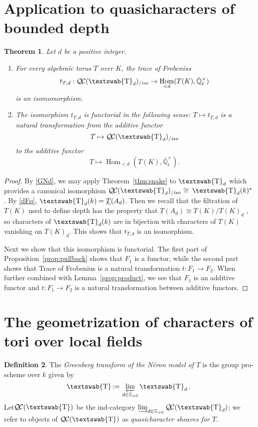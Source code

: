 \documentclass[11pt]{amsart}
\newcommand{\mathswab}[1]{\operatorname{\textswab{#1}}}
\theoremstyle{plain}
\newtheorem{theorem}{Theorem}[section]
\theoremstyle{definition}
\newtheorem{definition}[theorem]{Definition}
\theoremstyle{remark}
\newcommand{\ZZ}{{\mathbb{Z}}}
\newcommand{\EE}{\mathbb{\bar Q}_\ell}
\newcommand{\Fq}{k}
\newcommand{\EEx}{\EE^\times}
\DeclareMathOperator{\Hom}{Hom}
\newcommand{\cdef}[1]{ {#1}\index{#1} }
\newcommand{\ceq}{{\, :=\, }}
\newcommand{\iso}{{\ \cong\ }}
\newcommand{\GN}[1]{\mathswab{#1}}
\newcommand{\TT}{\underline{T}}
\newcommand{\QC}{{\mathcal{Q\hskip-0.8pt C}}}
\newcommand{\QCiso}[1]{\QC(#1)_{/\textit{iso}}}
\newcommand{\trFrob}[1]{t_{#1}}
\begin{document}
\section{Application to quasicharacters of bounded depth} \label{sec:bdchar}

\begin{theorem}\label{thm:application}
Let $d$ be a positive integer.
\begin{enumerate}
\item 
For every algebraic torus $T$ over $K$, the trace of Frobenius 
  \[
\trFrob{T,d}:  \QCiso{\GN{T}_d} \to \Hom_{< d}(T(K),\EEx)
  \]
is an isomomorphism. 
\item The isomorphism $\trFrob{T,d}$ is functorial in the following sense: $T \mapsto \trFrob{T,d}$ is a natural transformation
from the additive functor
\[T \mapsto \QCiso{\GN{T}_d}\]
to the additive functor
\[
T \mapsto \Hom_{<d}(T(K),\EEx).
\]
\end{enumerate}
\end{theorem}

\begin{proof}
  By \ref{GNd}, we may apply Theorem~\ref{thm:snake} to
  $\GN{T}_d$ which provides a canonical isomorphism
  $\QCiso{\GN{T}_d} \iso \GN{T}_d(\Fq)^*$.
  By \ref{dFq}, $\GN{T}_d(\Fq) = \TT(A_d)$.
  Then we recall that the filtration of $T(K)$ used to
  define depth has the property that $\TT(A_d) \cong T(K) / T(K)_d$
  \cite[Prop 5.2]{yu:03a}, so characters of $\GN{T}_d(\Fq)$ 
  are in bijection with characters of $T(K)$ vanishing on $T(K)_d$. 
  This shows that $\trFrob{T,d}$ is an isomorphism.
  
  Next we show that this isomorphism is functorial.
The first part of Proposition~\ref{prop:pullback} shows that $F_1$ is a functor, while the second part shows that Trace of Frobenius is a natural transformation $t: F_1 \to F_2$. When further combined with Lemma~\ref{prop:product}, we see that $F_1$ is an additive functor and $t: F_1 \to F_2$ is a natural transformation between additive functors.
\end{proof}


\section{The geometrization of characters of tori over local fields} \label{sec:quasichar} 

\begin{definition}
The \emph{Greenberg transform of the N\'eron model of $T$} is the group pro-scheme over $\Fq$ given by
\begin{equation}\label{projlim}
  \cdef{\GN{T}} \ceq \varprojlim_{d\in \ZZ_{>0}} \GN{T}_{d}.
\end{equation}
Let$\QC(\GN{T})$ be the ind-category $\varinjlim_{d\in \ZZ_{>0}} \QC(\GN{T}_d)$;
we refer to objects of $\QC(\GN{T})$ as \emph{quasicharacter sheaves for $T$}.
\end{definition}
\end{document}

